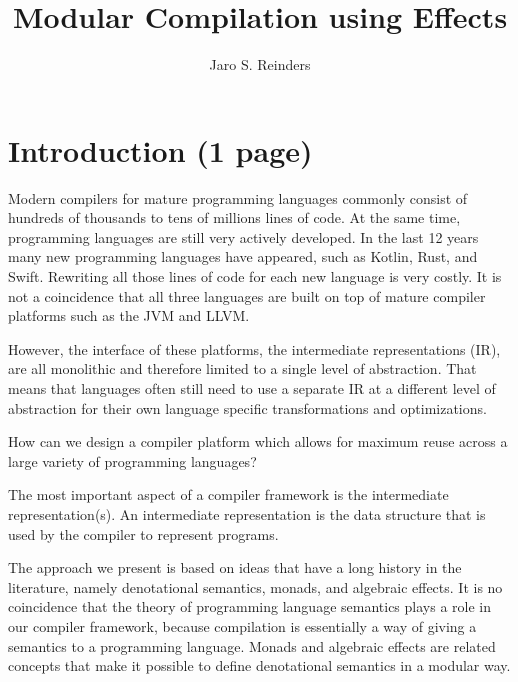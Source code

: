\documentclass[sigplan,anonymous,review]{acmart}
\title{Modular Compilation using Effects}
\author{Jaro S. Reinders} %
\begin{document}
\begin{abstract}

\end{abstract}

\maketitle

\section{Introduction (1 page)} \label{sec:intro}

Modern compilers for mature programming languages commonly consist of hundreds of thousands to tens of millions lines of code.
At the same time, programming languages are still very actively developed.
In the last 12 years many new programming languages have appeared, such as Kotlin, Rust, and Swift.
Rewriting all those lines of code for each new language is very costly.
It is not a coincidence that all three languages are built on top of mature compiler platforms such as the JVM and LLVM.

However, the interface of these platforms, the intermediate representations (IR), are all monolithic and therefore limited to a single level of abstraction.
That means that languages often still need to use a separate IR at a different level of abstraction for their own language specific transformations and optimizations.

How can we design a compiler platform which allows for maximum reuse across a large variety of programming languages?

The most important aspect of a compiler framework is the intermediate representation(s).
An intermediate representation is the data structure that is used by the compiler to represent programs.

The approach we present is based on ideas that have a long history in the literature, namely denotational semantics, monads, and algebraic effects.
It is no coincidence that the theory of programming language semantics plays a role in our compiler framework, because compilation is essentially a way of giving a semantics to a programming language.
Monads and algebraic effects are related concepts that make it possible to define denotational semantics in a modular way.
\end{document}
